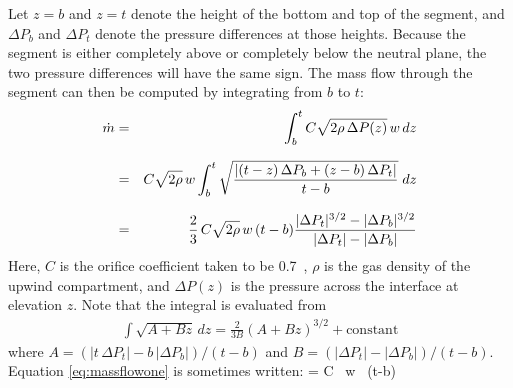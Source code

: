 Let $z=b$ and $z=t$ denote the height of the bottom and top of the segment, and $\Delta P_b$ and $\Delta P_t$ denote the pressure differences at those heights.  Because the segment is either completely above or completely below the neutral plane, the two pressure differences will have the same sign. The mass flow through the segment can then be computed by integrating from $b$ to $t$:
\begin{eqnarray}
\dot{m} &=& \int_b^t C \sqrt{2 \rho \, \Delta P(z)} \, w \, dz  \\[.1in]
    &=& C\sqrt{2\rho} \, w \int_b^t\sqrt{\frac{|(t-z) \, \Delta P_b + (z-b) \, \Delta P_t|}{t-b}} \; dz \\[.1in]
    &=& \frac{2}{3} \, C \sqrt{2\rho} \, w \, (t-b)\frac{|\Delta P_t|^{3/2}-|\Delta P_b|^{3/2}}{|\Delta P_t|-|\Delta P_b|}
\label{eq:massflowone}
\end{eqnarray}
Here, $C$ is the orifice coefficient taken to be 0.7~\cite{Steckler_Coefficients}, $\rho$ is the gas density of the upwind compartment, and $\Delta P(z)$ is the pressure across the interface at elevation $z$. Note that the integral is evaluated from
\begin{eqnarray}
\int \sqrt{A+Bz} \, dz = \frac{2}{3B}(A+Bz)^{3/2}+\mbox{constant}
\end{eqnarray}
where $A=(|t\,\Delta P_t|-b\,|\Delta P_b|)/(t-b)$ and $B=(|\Delta P_t|-|\Delta P_b|)/(t-b)$.
Equation \ref{eq:massflowone} is sometimes written:
\be
   \dm =  C \sqrt{2 \rho} \, w \, (t-b)  
\ee

